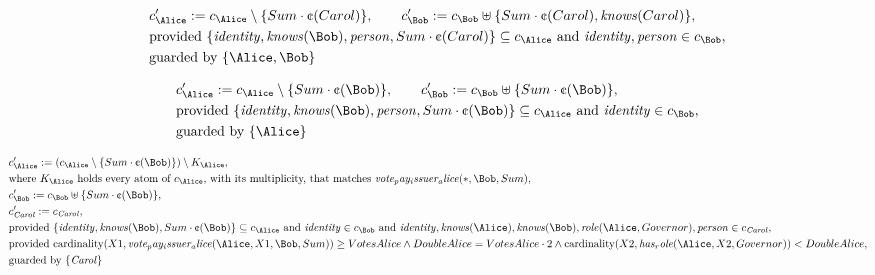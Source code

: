 \begin{align*}
&
c'_
{
\Alice
}
 := 
c_
{
\Alice
}
 \setminus 
\{
Sum
\cdot
\text{\textcent}
(
Carol
)
\}
, \qquad 
c'_
{
\Bob
}
 := 
c_
{
\Bob
}
 \uplus 
\{
Sum
\cdot
\text{\textcent}
(
Carol
)
,
\mathit{
knows
}
(
Carol
)
\}
,\\
&
\text{provided } 
\{
\mathit{
identity
}
,
\mathit{
knows
}
(
\Bob
)
,
\mathit{
person
}
,
Sum
\cdot
\text{\textcent}
(
Carol
)
\}
 \subseteq c_
{
\Alice
}
 \text{ and } 
\mathit{
identity
}
,
\mathit{
person
}
 \in c_
{
\Bob
}
,\\
&
\text{guarded by } \{
\Alice
,
\Bob
\}
\end{align*}

\begin{align*}
&
c'_
{
\Alice
}
 := 
c_
{
\Alice
}
 \setminus 
\{
Sum
\cdot
\text{\textcent}
(
\Bob
)
\}
, \qquad 
c'_
{
\Bob
}
 := 
c_
{
\Bob
}
 \uplus 
\{
Sum
\cdot
\text{\textcent}
(
\Bob
)
\}
,\\
&
\text{provided } 
\{
\mathit{
identity
}
,
\mathit{
knows
}
(
\Bob
)
,
\mathit{
person
}
,
Sum
\cdot
\text{\textcent}
(
\Bob
)
\}
 \subseteq c_
{
\Alice
}
 \text{ and } 
\mathit{
identity
}
 \in c_
{
\Bob
}
,\\
&
\text{guarded by } \{
\Alice
\}
\end{align*}

\begin{align*}
&
c'_
{
\Alice
}
 := 
(c_
{
\Alice
}
 \setminus 
\{
Sum
\cdot
\text{\textcent}
(
\Bob
)
\}
) \setminus K_
{
\Alice
}
,\\
&
\text{where } K_
{
\Alice
}
 \text{ holds every atom of } c_
{
\Alice
}
 \text{, with its multiplicity, that matches } 
\mathit{
vote_pay_issuer_alice
}
(
\ast
,
\Bob
,
Sum
)
,\\
&
c'_
{
\Bob
}
 := 
c_
{
\Bob
}
 \uplus 
\{
Sum
\cdot
\text{\textcent}
(
\Bob
)
\}
,\\
&
c'_
{
\mathit{Carol}
}
 := 
c_
{
\mathit{Carol}
}
,\\
&
\text{provided } 
\{
\mathit{
identity
}
,
\mathit{
knows
}
(
\Bob
)
,
Sum
\cdot
\text{\textcent}
(
\Bob
)
\}
 \subseteq c_
{
\Alice
}
 \text{ and } 
\mathit{
identity
}
 \in c_
{
\Bob
}
 \text{ and } 
\mathit{
identity
}
,
\mathit{
knows
}
(
\Alice
)
,
\mathit{
knows
}
(
\Bob
)
,
\mathit{
role
}
(
\Alice
,
Governor
)
,
\mathit{
person
}
 \in c_
{
\mathit{Carol}
}
,\\
&
\text{provided } 
\mathrm{cardinality}(
X1
,
\mathit{
vote_pay_issuer_alice
}
(
\Alice
,
X1
,
\Bob
,
Sum
)
)
\ge
VotesAlice
\land
DoubleAlice
=
VotesAlice
\cdot
2
\land
\mathrm{cardinality}(
X2
,
\mathit{
has_role
}
(
\Alice
,
X2
,
Governor
)
)
<
DoubleAlice
,\\
&
\text{guarded by } \{
\mathit{Carol}
\}
\end{align*}
